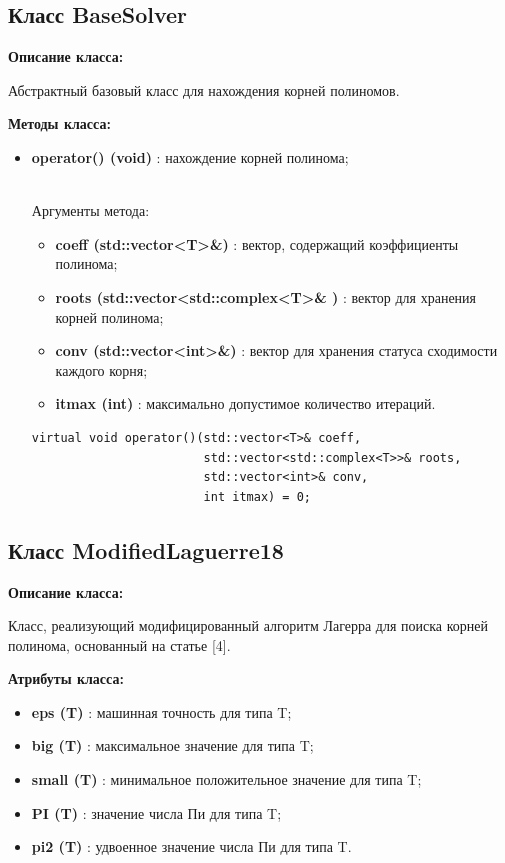\documentclass[a4paper,12pt]{article}
\begin{document}
\subsection{Класс BaseSolver}
\textbf{Описание класса:}

Абстрактный базовый класс для нахождения корней полиномов. 

\textbf{Методы класса:}
\begin{itemize}
    \item \textbf{operator() (void)} : нахождение корней полинома;

\\Аргументы метода:
    \begin{itemize}
        \renewcommand{\labelitemi}{-}
        \item \textbf{coeff (std::vector<T>\&)} : вектор, содержащий коэффициенты полинома;
        \item \textbf{roots (std::vector<std::complex<T>\& )} : вектор для хранения корней полинома;
        \item \textbf{conv (std::vector<int>\&)} : вектор для хранения статуса сходимости каждого корня;
        \item \textbf{itmax (int)} : максимально допустимое количество итераций.
    \end{itemize}
\begin{lstlisting}[language=С++]
virtual void operator()(std::vector<T>& coeff, 
                        std::vector<std::complex<T>>& roots, 
                        std::vector<int>& conv, 
                        int itmax) = 0; \end{lstlisting}
\end{itemize}
    
\subsection{Класс ModifiedLaguerre18}
\textbf{Описание класса:}

Класс, реализующий модифицированный алгоритм Лагерра для поиска корней полинома, основанный на статье [4].

\textbf{Атрибуты класса:}
\begin{itemize}
\renewcommand{\labelitemi}{-}
    \item \textbf{eps (T)} : машинная точность для типа T;
    \item \textbf{big (T)} : максимальное значение для типа T;
    \item \textbf{small (T)} : минимальное положительное значение для типа T;
    \item \textbf{PI (T)} : значение числа Пи для типа T;
    \item \textbf{pi2 (T)} : удвоенное значение числа Пи для типа T.
\end{itemize}
\end{document}
